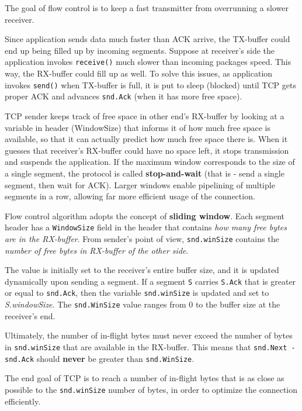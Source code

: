 \documentclass[10pt]{extreport}
\begin{document}
The goal of flow control is to keep a fast transmitter from overrunning a
slower receiver.

Since application sends data much faster than ACK arrive, the TX-buffer could
end up being filled up by incoming segments. Suppose at receiver's side the
application invokes \texttt{receive()} much slower than incoming packages
speed. This way, the RX-buffer could fill up as well. To solve this issues, as
application invokes \texttt{send()} when TX-buffer is full, it is
put to sleep (blocked) until TCP gets proper ACK and advances \texttt{snd.Ack}
(when it has more free space).

TCP sender keeps track of free space in other end's RX-buffer by looking at a
variable in header (WindowSize) that informs it of how much free space is
available, so that it can actually predict how much free space there is. When
it guesses that receiver's RX-buffer could have no space left, it stops
transmission and suspends the application. If the maximum window corresponds to
the size of a single segment, the protocol is called \textbf{stop-and-wait}
(that is \-- send a single segment, then wait for ACK). Larger windows enable
pipelining of multiple segments in a row, allowing far more efficient usage of
the connection.

Flow control algorithm adopts the concept of \textbf{sliding window}. Each
segment header has a \texttt{WindowSize} field in the header that contains
\emph{how many free bytes are in the RX-buffer}. From sender's point of view,
\texttt{snd.winSize} contains the \emph{number of free bytes in RX-buffer of
the other side}.

The value is initially set to the receiver's entire buffer size, and it is
updated dynamically upon sending a segment. If a segment \texttt{S} carries
\texttt{S.Ack} that is greater or equal to \texttt{snd.Ack}, then the variable
\texttt{snd.winSize} is updated and set to \emph{S.windowSize}. The
\texttt{snd.WinSize} value ranges from $0$ to the buffer size at the receiver's
end.

Ultimately, the number of in-flight bytes must never exceed the number of bytes
in \texttt{snd.winSize} that are available in the RX-buffer. This means that
\texttt{snd.Next - snd.Ack} should \textbf{never} be greater than
\texttt{snd.\-WinSize}.

The end goal of TCP is to reach a number of in-flight bytes that is as close as
possible to the \texttt{snd.winSize} number of bytes, in order to optimize the
connection efficiently.
\end{document}
